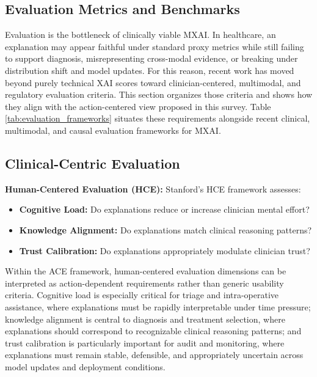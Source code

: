 \documentclass[pdflatex,sn-mathphys-num]{sn-jnl}%
\theoremstyle{thmstyleone}%
\theoremstyle{thmstyletwo}%
\theoremstyle{thmstylethree}%
\begin{document}
\begin{itemize}
\section{Evaluation Metrics and Benchmarks}

Evaluation is the bottleneck of clinically viable MXAI. In healthcare, an explanation may appear faithful under standard proxy metrics while still failing to support diagnosis, misrepresenting cross-modal evidence, or breaking under distribution shift and model updates. For this reason, recent work has moved beyond purely technical XAI scores toward clinician-centered, multimodal, and regulatory evaluation criteria. This section organizes those criteria and shows how they align with the action-centered view proposed in this survey. Table \ref{tab:evaluation_frameworks} situates these requirements alongside recent clinical, multimodal, and causal evaluation frameworks for MXAI.

\subsection{Clinical-Centric Evaluation}

\textbf{Human-Centered Evaluation (HCE):} Stanford's HCE framework \cite{gambetti2025surveyhumancenteredevaluationexplainable} assesses:
\begin{itemize}
    \item \textbf{Cognitive Load:} Do explanations reduce or increase clinician mental effort?
    \item \textbf{Knowledge Alignment:} Do explanations match clinical reasoning patterns?
    \item \textbf{Trust Calibration:} Do explanations appropriately modulate clinician trust?
\end{itemize}

Within the ACE framework, human-centered evaluation dimensions can be interpreted as action-dependent requirements rather than generic usability criteria. Cognitive load is especially critical for triage and intra-operative assistance, where explanations must be rapidly interpretable under time pressure; knowledge alignment is central to diagnosis and treatment selection, where explanations should correspond to recognizable clinical reasoning patterns; and trust calibration is particularly important for audit and monitoring, where explanations must remain stable, defensible, and appropriately uncertain across model updates and deployment conditions.


\end{itemize}
\end{document}
